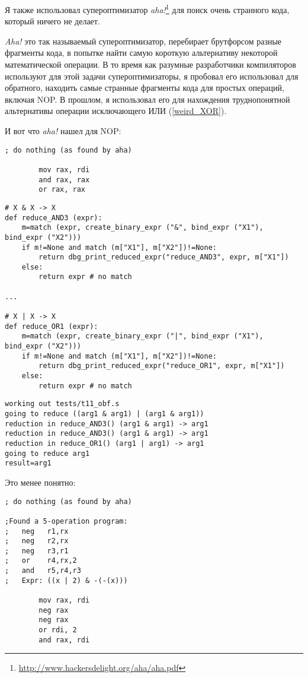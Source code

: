Я также использовал супероптимизатор \textit{aha!}\footnote{\url{http://www.hackersdelight.org/aha/aha.pdf}}
для поиск очень странного кода, который ничего не делает.

\textit{Aha!} это так называемый супероптимизатор, перебирает брутфорсом разные фрагменты кода, в попытке найти
самую короткую альтернативу некоторой математической операции.
В то время как разумные разработчики компиляторов используют для этой задачи супероптимизаторы, я пробовал его
использовал для обратного, находить самые странные фрагменты кода для простых операций, включая \ac{NOP}.
В прошлом, я использовал его для нахождения труднопонятной альтернативы операции исключающего ИЛИ (\ref{weird_XOR}).

И вот что \textit{aha!} нашел для \ac{NOP}:

\begin{lstlisting}
; do nothing (as found by aha)

        mov rax, rdi
        and rax, rax
        or rax, rax
\end{lstlisting}

\begin{lstlisting}
# X & X -> X
def reduce_AND3 (expr):
    m=match (expr, create_binary_expr ("&", bind_expr ("X1"), bind_expr ("X2")))
    if m!=None and match (m["X1"], m["X2"])!=None:
        return dbg_print_reduced_expr("reduce_AND3", expr, m["X1"])
    else:
        return expr # no match

...

# X | X -> X
def reduce_OR1 (expr):
    m=match (expr, create_binary_expr ("|", bind_expr ("X1"), bind_expr ("X2")))
    if m!=None and match (m["X1"], m["X2"])!=None:
        return dbg_print_reduced_expr("reduce_OR1", expr, m["X1"])
    else:
        return expr # no match
\end{lstlisting}

\begin{lstlisting}
working out tests/t11_obf.s
going to reduce ((arg1 & arg1) | (arg1 & arg1))
reduction in reduce_AND3() (arg1 & arg1) -> arg1
reduction in reduce_AND3() (arg1 & arg1) -> arg1
reduction in reduce_OR1() (arg1 | arg1) -> arg1
going to reduce arg1
result=arg1
\end{lstlisting}

Это менее понятно:

\begin{lstlisting}
; do nothing (as found by aha)

;Found a 5-operation program:
;   neg   r1,rx
;   neg   r2,rx
;   neg   r3,r1
;   or    r4,rx,2
;   and   r5,r4,r3
;   Expr: ((x | 2) & -(-(x)))

        mov rax, rdi
        neg rax
        neg rax
        or rdi, 2
        and rax, rdi
\end{lstlisting}

